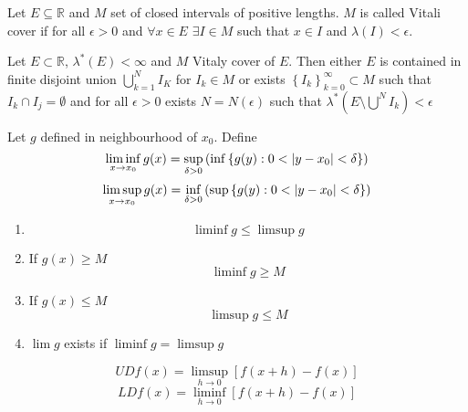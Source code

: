 \begin{definition}
	Let $E\subseteq \mathbb{R}$ and $M$ set of closed intervals  of positive lengths. $M$ is called Vitali cover if for all $\epsilon>0$ and $\forall x\in E$ $\exists I\in M$ such that $x\in I$ and $\lambda(I)<\epsilon$.
\end{definition}
\begin{theorem}[Vitaly]
	Let $E\subset \mathbb{R} $, $\lambda^*(E) <\infty$ and $M$ Vitaly cover of $E$. Then either $E$ is contained in finite disjoint union $\bigcup_{k=1}^N I_K$ for $I_k\in M$ or exists $\left\{ I_k\right\}_{k=0}^\infty \subset M$ such that $I_k\cap I_j = \emptyset$ and for all $\epsilon>0$ exists $N=N(\epsilon)$ such that $\lambda^*(E\setminus \bigcup^N I_k) < \epsilon$
\end{theorem}
\begin{definition}
	
	Let $g$ defined in neighbourhood of $x_0$. Define 
	$$\liminf_{x\to x_0} g(x)  = \sup\limits_{\delta > 0} \qty(\inf \left\{ g(y): 0<\abs{y-x_0} < \delta \right\})$$
	$$\limsup_{x\to x_0} g(x)  = \inf\limits_{\delta > 0} \qty(\sup \left\{ g(y): 0<\abs{y-x_0} < \delta \right\})$$
\end{definition}

\begin{lemma}
	\begin{enumerate}
		\item  $$\liminf g \leq \limsup g$$
		\item  If $g(x) \geq M$ 
		$$\liminf g \geq M$$
		\item  If $g(x) \leq M$ 
		$$\limsup g \leq M$$
		\item  $\lim g$ exists if $\liminf g = \limsup g$
	\end{enumerate}
\end{lemma}

\begin{definition}
	$$UD f(x) = \limsup_{h\to 0} [f(x+h) - f(x)]$$
	$$LD f(x) = \liminf_{h\to 0} [f(x+h) - f(x)]$$
\end{definition}

